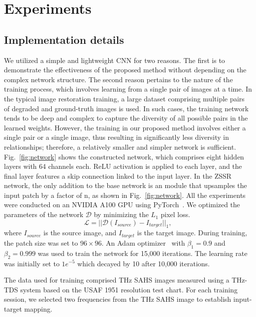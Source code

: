 \section{Experiments}
\label{sec:exp}
\subsection{Implementation details}
We utilized a simple and lightweight CNN for two reasons. The first is to demonstrate the effectiveness of the proposed method without depending on the complex network structure. The second reason pertains to the nature of the training process, which involves learning from a single pair of images at a time. In the typical image restoration training, a large dataset comprising multiple pairs of degraded and ground-truth images is used. In such cases, the training network tends to be deep and complex to capture the diversity of all possible pairs in the learned weights. However, the training in our proposed method involves either a single pair or a single image, thus resulting in significantly less diversity in relationships; therefore, a relatively smaller and simpler network is sufficient. Fig.~\ref{fig:network} shows the constructed network, which comprises eight hidden layers with 64 channels each. ReLU activation is applied to each layer, and the final layer features a skip connection linked to the input layer. In the ZSSR network, the only addition to the base network is an module that upsamples the input patch by a factor of n, as shown in Fig.~\ref{fig:network}. All the experiments were conducted on an NVIDIA A100 GPU using PyTorch~\cite{paszke2019pytorch}. We optimized the parameters of the network $\mathcal{D}$ by minimizing the $L_1$ pixel loss.
\begin{equation}
    \mathcal{L} = ||\mathcal{D}(I_{source}) - I_{target}||_1,
\end{equation}
where $I_{source}$ is the source image, and $I_{target}$ is the target image. During training, the patch size was set to $96\times96$. An Adam optimizer~\cite{kingma2014adam} with $\beta_1=0.9$ and $\beta_2=0.999$ was
used to train the network for 15,000 iterations. The learning rate was initially set to $1e^{-5}$ which decayed by 10 after 10,000 iterations.

The data used for training comprised THz SAHS images measured using a THz-TDS system based on the USAF 1951 resolution test chart. For each training session, we selected two frequencies from the THz SAHS image to establish input-target mapping.

